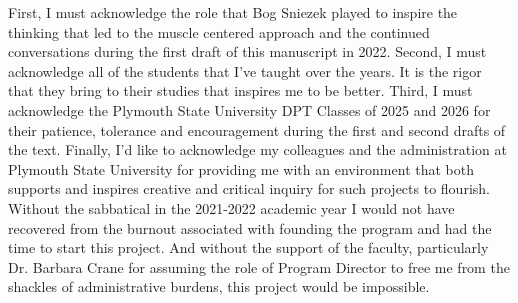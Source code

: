 %
%


First, I must acknowledge the role that Bog Sniezek played to inspire the thinking that led to the muscle centered approach and the continued conversations during the first draft of this manuscript in 2022. Second, I must acknowledge all of the students that I've taught over the years. It is the rigor that they bring to their studies that inspires me to be better. Third, I must acknowledge the Plymouth State University DPT Classes of 2025 and 2026 for their patience, tolerance and encouragement during the first and second drafts of the text. Finally, I'd like to acknowledge my colleagues and the administration at Plymouth State University for providing me with an environment that both supports and inspires creative and critical inquiry for such projects to flourish. Without the sabbatical in the 2021-2022 academic year I would not have recovered from the burnout associated with founding the program and had the time to start this project. And without the support of the faculty, particularly Dr. Barbara Crane for assuming the role of Program Director to free me from the shackles of administrative burdens, this project would be impossible.

